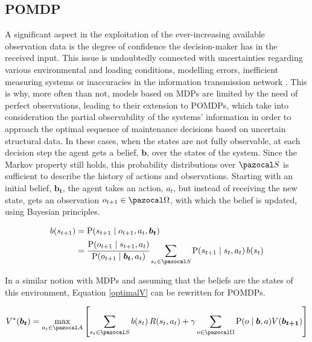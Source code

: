 \subsection{\acrfull{POMDP}} \label{pomdpSec}

A significant aspect in the exploitation of the ever-increasing available observation data is the degree of confidence the decision-maker has in the received input. This issue is undoubtedly connected with uncertainties regarding various environmental and loading conditions, modelling errors, inefficient measuring systems or inaccuracies in the information transmission network \cite{schobi2016maintenance}. This is why, more often than not, models based on \glspl{MDP} are limited by the need of perfect observations, leading to their extension to \glspl{POMDP}, which take into consideration the partial observability of the systems' information in order to approach the optimal sequence of maintenance decisions based on uncertain structural data. In these cases, when the states are not fully observable, at each decision step the agent gets a belief, $\boldsymbol{b}$, over the states of the system. Since the Markov property still holds, this probability distributions over $\ccal{S}$ is sufficient to describe the history of actions and observations. Starting with an initial belief, $\boldsymbol{b_t}$, the agent takes an action, $a_t$, but instead of receiving the new state, gets an observation $o_{t+1}\in \ccal{\Omega}$, with which the belief is updated, using Bayesian principles.

\begin{align}
    b(s_{t+1}) &= \prob{s_{t+1}\mid o_{t+1}, a_t, \boldsymbol{b_t}} \nonumber \\
    &= \cfrac{\prob{o_{t+1}\mid s_{t+1}, a_t}}{\prob{o_{t+1}\mid \boldsymbol{b_t},a_t}} \sum _{s_t \in \ccal{S}} \prob{s_{t+1}\mid s_t, a_t}\, b(s_t) \label{discBeliefEq}
\end{align}

In a similar notion with \glspl{MDP} and assuming that the beliefs are the states of this environment, Equation \ref{optimalV} can be rewritten for \glspl{POMDP}.

\begin{equation}
    V^*(\boldsymbol{b_t}) = \underset{a_t\in \ccal{A}}{\text{max}} \left[ \sum _{s_t\in\ccal{S}} b(s_t) \, R(s_t, a_t) + \gamma \sum _{o\in \ccal{\Omega}} \prob{o\mid \boldsymbol{b},a) V(\boldsymbol{b_{t+1}}}\right]
\end{equation}

